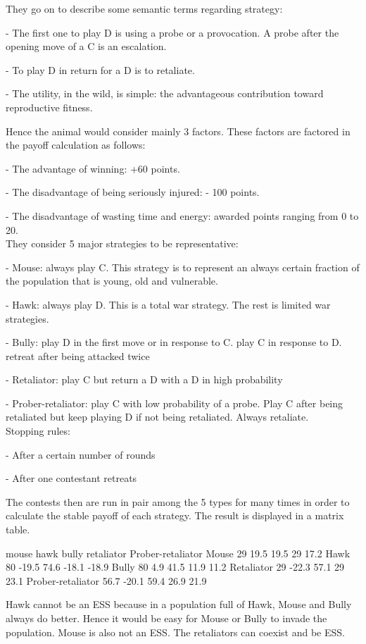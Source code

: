 \documentclass[12.5pt]{report}
\begin{document}
They go on to describe some semantic terms regarding strategy:

- The first one to play D is using a probe or a provocation. A probe after the opening move of a C is an escalation.

- To play D in return for a D is to retaliate.

- The utility, in the wild, is simple: the advantageous contribution toward reproductive fitness. 

Hence the animal would consider mainly 3 factors. These factors are factored in the payoff calculation as follows:

- The advantage of winning: +60 points.

- The disadvantage of being seriously injured: - 100 points.

- The disadvantage of wasting time and energy: awarded points ranging from 0 to 20.\\

They consider 5 major strategies to be representative:

- Mouse: always play C. This strategy is to represent an always certain fraction of the population that is young, old and vulnerable.

- Hawk:  always play D. This is a total war strategy. The rest is limited war strategies.

- Bully: play D in the first move or in response to C. play C in response to D. retreat after being attacked twice

- Retaliator: play C but return a D with a D in high probability 

- Prober-retaliator: play C with low probability of a probe. Play C after being retaliated but keep playing D if not being retaliated. Always retaliate.\\

Stopping rules:

- After a certain number of rounds

- After one contestant retreats

The contests then are run in pair among the 5 types for many times in order to calculate the stable payoff of each strategy. The result is displayed in a matrix table. 

mouse
hawk
bully
retaliator
Prober-retaliator
Mouse
29
19.5
19.5
29
17.2
Hawk
80
-19.5
74.6
-18.1
-18.9
Bully
80
4.9
41.5
11.9
11.2
Retaliator
29
-22.3
57.1
29
23.1
Prober-retaliator
56.7
-20.1
59.4
26.9
21.9

Hawk cannot be an ESS because in a population full of Hawk, Mouse and Bully always do better. Hence it would be easy for Mouse or Bully to invade the population. Mouse is also not an ESS. The retaliators can coexist and be ESS. \\
\end{document}
